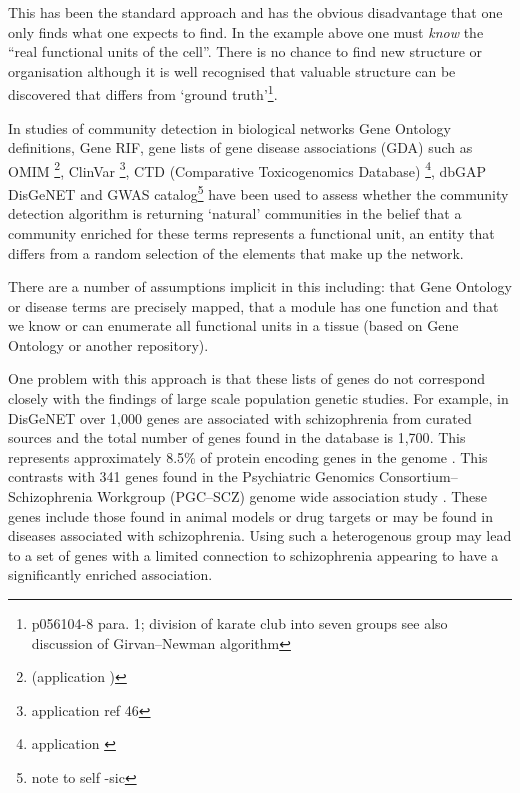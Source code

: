 This has been the standard approach and has the obvious disadvantage that one only finds what one expects to find. In the example above one must \textit{know} the ``real functional units of the cell''. There is no chance to find new structure or organisation although it is well recognised that valuable structure can be discovered that differs from `ground truth'\cite{fortunato2016community}\footnote{p056104-8 para. 1; division of karate club into seven groups see also discussion of Girvan–Newman algorithm}. 

In studies of community detection in biological networks Gene Ontology definitions\cite{mclean2016improved}, Gene RIF, gene lists of gene disease associations (GDA) such as OMIM \cite{hamosh2005online}\footnote{(application \cite{ghiassian2015disease})}, ClinVar \cite{landrum2016clinvar}\footnote{application \cite{luck2020reference} ref 46}, CTD (Comparative Toxicogenomics Database) \cite{davis2019comparative}\footnote{application \cite{baker2012geneweaver}}, dbGAP \cite{tryka2014ncbi} DisGeNET \cite{pinero2020disgenet} \cite{pinero2016disgenet} and GWAS catalog\footnote{note to self -sic}\cite{welter2014nhgri} have been used  to assess whether the community detection algorithm is returning `natural' communities in the belief that a community enriched for these terms represents a functional unit, an entity that differs from a random selection of the elements that make up the network. 

There are a number of assumptions implicit in this including: that Gene Ontology or disease terms are precisely mapped, that a module has one function and that we know or can enumerate all functional units in a tissue (based on Gene Ontology or another repository).

One problem with this approach is that these lists of genes do not correspond closely with the findings of large scale population genetic studies. For example, in DisGeNET over 1,000 genes are associated with schizophrenia from curated sources and the total number of genes found in the database is 1,700\cite{pinero2020disgenet}. This represents approximately 8.5\% of protein encoding genes in the genome \cite{ezkurdia2014multiple}. This contrasts with 341 genes found in the Psychiatric Genomics Consortium–Schizophrenia Workgroup (PGC–SCZ) genome wide association study \cite{ripke2014biological}. These genes include those found in animal models or drug targets or may be found in diseases associated with schizophrenia. Using such a heterogenous group may lead to a set of genes with a limited connection to schizophrenia appearing to have a significantly enriched association.  


